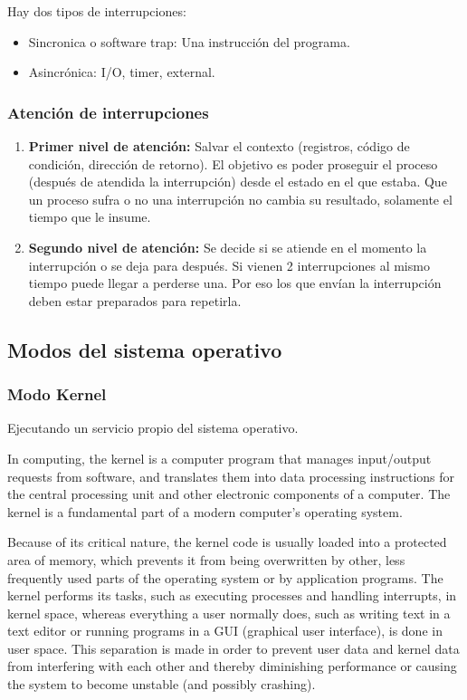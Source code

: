 \documentclass[a4paper, twoside]{article}
\begin{document}
Hay dos tipos de interrupciones:
\begin{itemize}
	\item Sincronica o software trap: Una instrucción del programa.
	\item Asincrónica: I/O, timer, external.
\end{itemize}

\subsubsection{Atención de interrupciones}
\begin{enumerate}
	\item \textbf{Primer nivel de atención:} Salvar el contexto (registros, código de condición, dirección de retorno). El objetivo es poder proseguir el proceso (después de atendida la interrupción) desde el estado en el que estaba. Que un proceso sufra o no una interrupción no cambia su resultado, solamente el tiempo que le insume.
	
	\item \textbf{Segundo nivel de atención:} Se decide si se atiende en el momento la interrupción o se deja para después. Si vienen 2 interrupciones al mismo tiempo puede llegar a perderse una. Por eso los que envían la interrupción deben estar preparados para repetirla.
\end{enumerate}

\subsection{Modos del sistema operativo}
\subsubsection{Modo Kernel}
Ejecutando un servicio propio del sistema operativo.

In computing, the kernel is a computer program that manages input/output requests from software, and translates them into data processing instructions for the central processing unit and other electronic components of a computer. The kernel is a fundamental part of a modern computer's operating system.

Because of its critical nature, the kernel code is usually loaded into a protected area of memory, which prevents it from being overwritten by other, less frequently used parts of the operating system or by application programs. The kernel performs its tasks, such as executing processes and handling interrupts, in kernel space, whereas everything a user normally does, such as writing text in a text editor or running programs in a GUI (graphical user interface), is done in user space. This separation is made in order to prevent user data and kernel data from interfering with each other and thereby diminishing performance or causing the system to become unstable (and possibly crashing).
\end{document}
